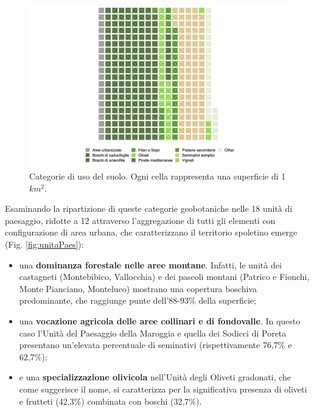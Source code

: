 \documentclass[
]{book}
\begin{document}
\begin{figure}
\includegraphics[width=50.75in]{./figs/RECSpoleto_usoSuoloPlot} \caption{Categorie di uso del suolo. Ogni cella rappresenta una superficie di 1 $km^2$.}\label{fig:usoSuolo}
\end{figure}

Esaminando la ripartizione di queste categorie geobotaniche nelle 18 unità di paesaggio, ridotte a 12 attraverso l'aggregazione di tutti gli elementi con configurazione di area urbana, che caratterizzano il territorio spoletino emerge (Fig. \ref{fig:unitaPaes}):

\begin{itemize}
\item
  una \textbf{dominanza forestale nelle aree montane}.
  Infatti, le unità dei castagneti (Montebibico, Vallocchia) e dei pascoli montani (Patrico e Fionchi, Monte Pianciano, Monteluco) mostrano una copertura boschiva predominante, che raggiunge punte dell'88-93\% della superficie;
\item
  una \textbf{vocazione agricola delle aree collinari e di fondovalle}.
  In questo caso l'Unità del Paesaggio della Maroggia e quella dei Sodicci di Poreta presentano un'elevata percentuale di seminativi (rispettivamente 76,7\% e 62,7\%);
\item
  e una \textbf{specializzazione olivicola} nell'Unità degli Oliveti gradonati, che come suggerisce il nome, si caratterizza per la significativa presenza di oliveti e frutteti (42,3\%) combinata con boschi (32,7\%).
\end{itemize}
\end{document}
